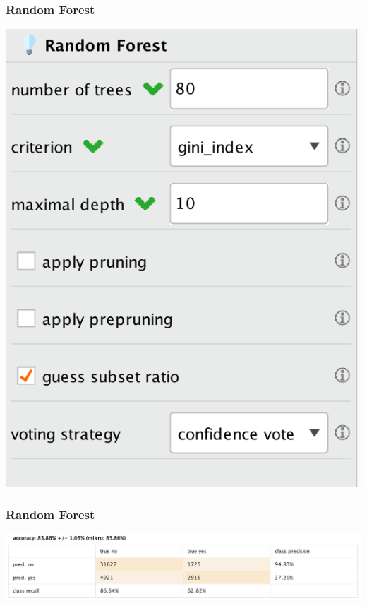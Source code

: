 \documentclass{beamer}
\begin{document}
\begin{frame}
	\frametitle{Random Forest}
  \includegraphics[width=\textwidth,height=\textheight,keepaspectratio]{rand-forest-opt}
\end{frame}

\begin{frame}
	\frametitle{Random Forest}
  \includegraphics[width=\textwidth,height=\textheight,keepaspectratio]{rand-forest}
\end{frame}
\end{document}
